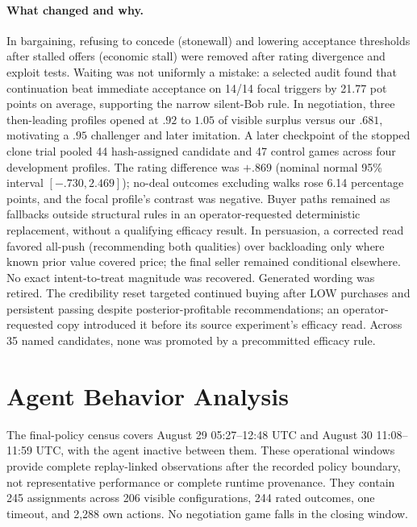 \documentclass{article}
\begin{document}
\paragraph{What changed and why.}
In bargaining, refusing to concede (stonewall) and lowering acceptance
thresholds after stalled offers (economic stall) were removed after rating
divergence and exploit tests. Waiting was not uniformly a mistake: a selected
audit found that continuation beat immediate acceptance on 14/14 focal
triggers by 21.77 pot points on average, supporting the narrow silent-Bob rule.
In negotiation, three then-leading profiles opened at $.92$ to $1.05$ of
visible surplus versus our $.681$, motivating a $.95$ challenger and later
imitation. A later checkpoint of the stopped clone trial pooled 44 hash-assigned
candidate and 47 control games across four development profiles. The rating
difference was $+.869$ (nominal normal 95\% interval $[-.730,2.469]$);
no-deal outcomes excluding walks rose 6.14 percentage points, and the focal
profile's contrast was negative. Buyer paths remained as fallbacks outside structural rules in an
operator-requested deterministic replacement, without a qualifying efficacy result.
In persuasion, a corrected read favored all-push (recommending both qualities)
over backloading only where known prior value covered price; the final seller
remained conditional elsewhere. No exact intent-to-treat magnitude was recovered.
Generated wording was retired. The credibility reset targeted continued buying
after LOW purchases and persistent passing despite posterior-profitable
recommendations; an operator-requested copy introduced it before its source
experiment's efficacy read.
Across 35 named candidates, none was promoted by a precommitted efficacy rule.

\section{Agent Behavior Analysis}
\label{sec:behavior}

The final-policy census covers August 29 05:27--12:48 UTC and August 30
11:08--11:59 UTC, with the agent inactive between them. These operational
windows provide complete replay-linked observations after the recorded policy
boundary, not representative performance or complete runtime provenance.
They contain 245 assignments
across 206 visible configurations, 244 rated outcomes, one timeout, and 2,288
own actions. No negotiation game falls in the closing window.
\end{document}
